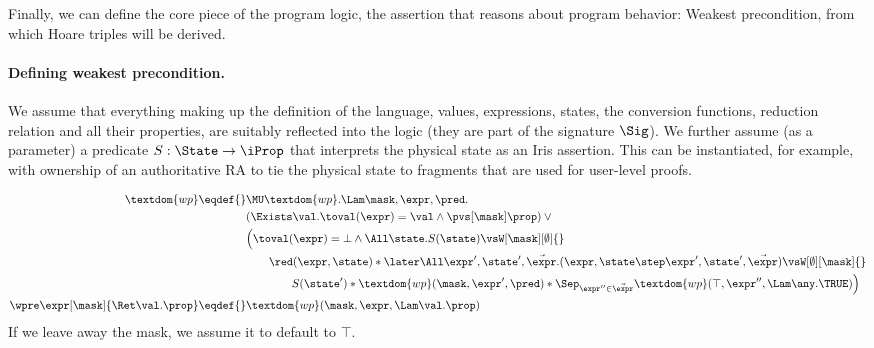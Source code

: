 Finally, we can define the core piece of the program logic, the assertion that reasons about program behavior: Weakest precondition, from which Hoare triples will be derived.

\paragraph{Defining weakest precondition.}
We assume that everything making up the definition of the language, \ie values, expressions, states, the conversion functions, reduction relation and all their properties, are suitably reflected into the logic (\ie they are part of the signature $\Sig$).
We further assume (as a parameter) a predicate $S : \State \to \iProp$ that interprets the physical state as an Iris assertion.
This can be instantiated, for example, with ownership of an authoritative RA to tie the physical state to fragments that are used for user-level proofs.

\begin{align*}
  \textdom{wp} \eqdef{}& \MU \textdom{wp}. \Lam \mask, \expr, \pred. \\
        & (\Exists\val. \toval(\expr) = \val \land \pvs[\mask] \prop) \lor {}\\
        & \Bigl(\toval(\expr) = \bot \land \All \state. S(\state) \vsW[\mask][\emptyset] {}\\
        &\qquad \red(\expr, \state) * \later\All \expr', \state', \vec\expr. (\expr, \state \step \expr', \state', \vec\expr) \vsW[\emptyset][\mask] {}\\
        &\qquad\qquad S(\state') * \textdom{wp}(\mask, \expr', \pred) * \Sep_{\expr'' \in \vec\expr} \textdom{wp}(\top, \expr'', \Lam \any. \TRUE)\Bigr) \\
  \wpre\expr[\mask]{\Ret\val. \prop} \eqdef{}& \textdom{wp}(\mask, \expr, \Lam\val.\prop)
\end{align*}
If we leave away the mask, we assume it to default to $\top$.


